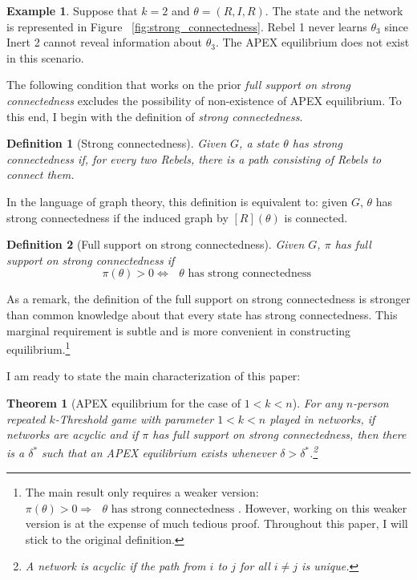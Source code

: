 \documentclass[12pt,letter]{article}
\newtheorem{theorem}{Theorem}
\newtheorem{definition}{Definition}[section]
\theoremstyle{definition}
\newtheorem{example}{Example}
\theoremstyle{remark}
\theoremstyle{claim}
\begin{document}
\begin{example}\label{ex_strong_connectedness}
Suppose that $k=2$ and $\theta=(R,I,R)$. The state and the network is represented in Figure ~\ref{fig:strong_connectedness}. Rebel 1 never learns $\theta_3$ since Inert 2 cannot reveal information about $\theta_3$. The APEX equilibrium does not exist in this scenario.
\end{example}

The following condition that works on the prior \textit{full support on strong connectedness} excludes the possibility of non-existence of APEX equilibrium. To this end, I begin with the definition of \textit{strong connectedness}.

\begin{definition}[Strong connectedness]
Given $G$, a state $\theta$ has strong connectedness if, for every two Rebels, there is a path consisting of Rebels to connect them.

\end{definition}  

In the language of graph theory, this definition is equivalent to: given $G$, $\theta$ has strong connectedness if the induced graph by $[R](\theta)$ is connected.

\begin{definition}[Full support on strong connectedness]
Given $G$, $\pi$ has full support on strong connectedness if 
\[\pi(\theta)>0\Leftrightarrow \text{ $\theta$ has strong connectedness }\] 
\end{definition}  

As a remark, the definition of the full support on strong connectedness is stronger than common knowledge about that every state has strong connectedness. This marginal requirement is subtle and is more convenient in constructing equilibrium.\footnote{The main result only requires a weaker version: $\pi(\theta)>0\Rightarrow \text{ $\theta$ has strong connectedness }$. However, working on this weaker version is at the expense of much tedious proof. Throughout this paper, I will stick to the original definition.} 

I am ready to state the main characterization of this paper:
\begin{theorem}[APEX equilibrium for the case of $1<k<n$]
\label{thm_main_result}
For any $n$-person repeated $k$-Threshold game with parameter $1<k<n$ played in networks, if networks are acyclic and if $\pi$ has full support on strong connectedness, then there is a $\delta^{*}$ such that an APEX equilibrium exists whenever $\delta>\delta^{*}$.\footnote{A network is acyclic if the path from $i$ to $j$ for all $i\neq j$ is unique.}

\end{theorem}
\end{document}
